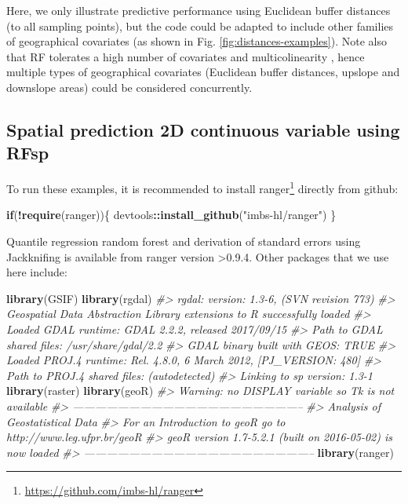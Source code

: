 \documentclass[graybox,natbib,nospthms,UStrade]{svmono}
\newenvironment{Shaded}{\begin{snugshade}}{\end{snugshade}}
\newcommand{\CommentTok}[1]{\textcolor[rgb]{0.37,0.37,0.37}{\textit{#1}}}
\newcommand{\ControlFlowTok}[1]{\textcolor[rgb]{0.27,0.27,0.27}{\textbf{#1}}}
\newcommand{\KeywordTok}[1]{\textcolor[rgb]{0.27,0.27,0.27}{\textbf{#1}}}
\newcommand{\NormalTok}[1]{#1}
\newcommand{\OperatorTok}[1]{\textcolor[rgb]{0.43,0.43,0.43}{\textbf{#1}}}
\newcommand{\StringTok}[1]{\textcolor[rgb]{0.5,0.5,0.5}{#1}}
\renewcommand{\href}[2]{#2 (\url{#1})}
\renewcommand{\href}[2]{#2\footnote{\url{#1}}}
\begin{document}
Here, we only illustrate predictive performance using Euclidean buffer distances
(to all sampling points), but the code could be adapted to
include other families of geographical covariates (as shown in
Fig. \ref{fig:distances-examples}). Note also that RF tolerates a high
number of covariates and multicolinearity \citep{Biau2016}, hence multiple
types of geographical covariates (Euclidean buffer distances, upslope
and downslope areas) could be considered concurrently.

\hypertarget{spatial-prediction-2d-continuous-variable-using-rfsp}{%
\subsection{Spatial prediction 2D continuous variable using RFsp}\label{spatial-prediction-2d-continuous-variable-using-rfsp}}

To run these examples, it is recommended to install \href{https://github.com/imbs-hl/ranger}{ranger} \citep{wright2017ranger} directly from github:

\begin{Shaded}
\begin{Highlighting}[]
\ControlFlowTok{if}\NormalTok{(}\OperatorTok{!}\KeywordTok{require}\NormalTok{(ranger))\{ devtools}\OperatorTok{::}\KeywordTok{install_github}\NormalTok{(}\StringTok{"imbs-hl/ranger"}\NormalTok{) \}}
\end{Highlighting}
\end{Shaded}

Quantile regression random forest and derivation of standard errors using Jackknifing is available from ranger version \textgreater{}0.9.4. Other packages that we use here include:

\begin{Shaded}
\begin{Highlighting}[]
\KeywordTok{library}\NormalTok{(GSIF)}
\KeywordTok{library}\NormalTok{(rgdal)}
\CommentTok{#> rgdal: version: 1.3-6, (SVN revision 773)}
\CommentTok{#>  Geospatial Data Abstraction Library extensions to R successfully loaded}
\CommentTok{#>  Loaded GDAL runtime: GDAL 2.2.2, released 2017/09/15}
\CommentTok{#>  Path to GDAL shared files: /usr/share/gdal/2.2}
\CommentTok{#>  GDAL binary built with GEOS: TRUE }
\CommentTok{#>  Loaded PROJ.4 runtime: Rel. 4.8.0, 6 March 2012, [PJ_VERSION: 480]}
\CommentTok{#>  Path to PROJ.4 shared files: (autodetected)}
\CommentTok{#>  Linking to sp version: 1.3-1}
\KeywordTok{library}\NormalTok{(raster)}
\KeywordTok{library}\NormalTok{(geoR)}
\CommentTok{#> Warning: no DISPLAY variable so Tk is not available}
\CommentTok{#> --------------------------------------------------------------}
\CommentTok{#>  Analysis of Geostatistical Data}
\CommentTok{#>  For an Introduction to geoR go to http://www.leg.ufpr.br/geoR}
\CommentTok{#>  geoR version 1.7-5.2.1 (built on 2016-05-02) is now loaded}
\CommentTok{#> --------------------------------------------------------------}
\KeywordTok{library}\NormalTok{(ranger)}
\end{Highlighting}
\end{Shaded}
\end{document}
